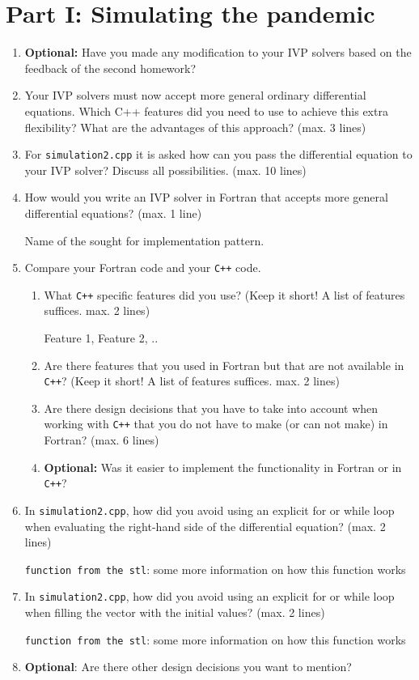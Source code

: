 \documentclass[a4paper]{article}
\newcommand{\answer}[1]{\vspace{-0.75em}\begin{framed} #1 \end{framed}\vspace{-0.75em}}
\begin{document}
\section*{Part I: Simulating the pandemic}
\begin{enumerate}[label={(I.\arabic*)}]
	\item \textbf{Optional:} Have you made any modification to your IVP solvers based on the feedback of the second homework?
	\answer{}
	\item Your IVP solvers must now accept more general ordinary differential equations. Which
C++ features did you need to use to achieve this extra flexibility? What are the advantages
of this approach? (max. 3 lines)
\answer{}
\item For \verb|simulation2.cpp| it is asked how can you pass the differential
equation to your IVP solver? Discuss all possibilities. (max. 10 lines)
	\answer{}
\item How would you write an IVP solver in Fortran that accepts more general differential
equations? (max. 1 line)
\answer{Name of the sought for implementation pattern.}
	\item Compare your Fortran code and your \verb|C++| code.
	\begin{enumerate}
	\item What \verb|C++| specific features did you use? (Keep it short! A list of features suffices.
max. 2 lines)
	\answer{\hspace{-1cm} Feature 1, Feature 2, ..}
	\item Are there features that you used in Fortran but that are not available in \verb|C++|? (Keep
it short! A list of features suffices. max. 2 lines)
	\answer{}
	\item Are there design decisions that you have to take into account when working with \verb|C++|
that you do not have to make (or can not make) in Fortran? (max. 6 lines)
\answer{}
	\item \textbf{Optional:} Was it easier to implement the functionality in Fortran or in \verb|C++|?
	\answer{}
	\end{enumerate}

	\item In \verb|simulation2.cpp|, how did you avoid using an explicit for or while loop when evaluating the right-hand side of the differential equation? (max. 2 lines)
	\answer{\texttt{function from the stl}: some more information on how this function works}
	\item In \verb|simulation2.cpp|, how did you avoid using an explicit for or while loop when filling
the vector with the initial values? (max. 2 lines)
	\answer{\texttt{function from the stl}: some more information on how this function works}
	\item \textbf{Optional}: Are there other design decisions you want to mention?
	\answer{}
\end{enumerate}
\end{document}
